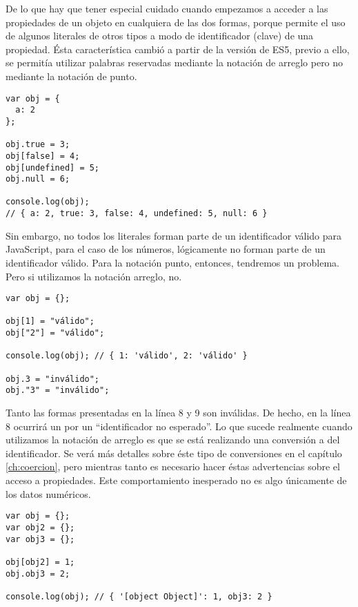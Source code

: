 De lo que hay que tener especial cuidado cuando empezamos a acceder a las propiedades de un objeto en cualquiera de las dos formas, porque permite el uso de algunos literales de otros tipos a modo de identificador (clave) de una propiedad. Ésta característica cambió a partir de la versión de ES5, previo a ello, se permitía utilizar palabras reservadas mediante la notación de arreglo pero no mediante la notación de punto.

\begin{lstlisting}[title={Utilizando literales como claves}]
var obj = {
  a: 2
};

obj.true = 3;
obj[false] = 4;
obj[undefined] = 5;
obj.null = 6;

console.log(obj);
// { a: 2, true: 3, false: 4, undefined: 5, null: 6 }​​​​​
\end{lstlisting}

Sin embargo, no todos los literales forman parte de un identificador válido para JavaScript, para el caso de los números, lógicamente no forman parte de un identificador válido. Para la notación punto, entonces, tendremos un problema. Pero si utilizamos la notación arreglo, no.

\begin{lstlisting}[title={Utilizando números como claves}]
var obj = {};

obj[1] = "válido";
obj["2"] = "válido";

console.log(obj); // ​​​​​{ 1: 'válido', 2: 'válido' }​​​​​

obj.3 = "inválido";
obj."3" = "inválido";
\end{lstlisting}

Tanto las formas presentadas en la línea 8 y 9 son inválidas. De hecho, en la línea 8 ocurrirá un  por un "`identificador no esperado"'. Lo que sucede realmente cuando utilizamos la notación de arreglo es que se está realizando una conversión a  del identificador. Se verá más detalles sobre éste tipo de conversiones en el capítulo \ref{ch:coercion}, pero mientras tanto es necesario hacer éstas advertencias sobre el acceso a propiedades. Este comportamiento inesperado no es algo únicamente de los datos numéricos.

\begin{lstlisting}[title={Utilizando objetos como claves}]
var obj = {};
var obj2 = {};
var obj3 = {};

obj[obj2] = 1;
obj.obj3 = 2;

console.log(obj); // ​​​​​{ '[object Object]': 1, obj3: 2 }​​​​​
\end{lstlisting}

